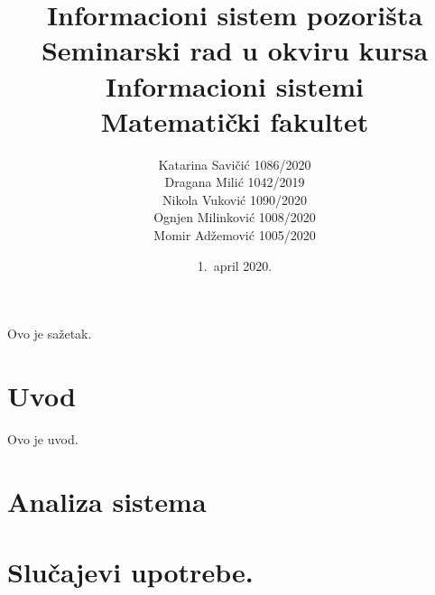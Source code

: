 \documentclass[a4paper]{article}
\begin{document}
\title{Informacioni sistem pozorišta\\ \small{Seminarski rad u okviru kursa\\Informacioni sistemi\\ Matematički fakultet}}

\author{
Katarina Savičić 1086/2020\\
Dragana Milić 1042/2019\\
Nikola Vuković 1090/2020\\
Ognjen Milinković 1008/2020\\
Momir Adžemović 1005/2020
}

\date{1.~april 2020.}

\maketitle

\abstract

Ovo je sažetak.

\newpage

\tableofcontents

\newpage

\section{Uvod}
Ovo je uvod.

\section{Analiza sistema}


\section{Slučajevi upotrebe.}
\end{document}
